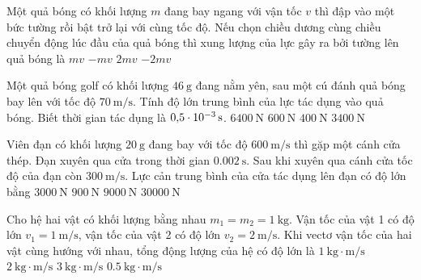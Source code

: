 \begin{ex}
	Một quả bóng có khối lượng $m$ đang bay ngang với vận tốc $v$ thì đập vào một bức tường rồi bật trở lại với cùng tốc độ. Nếu chọn chiều dương cùng chiều chuyển động lúc đầu của quả bóng thì xung lượng của lực gây ra bởi tường lên quả bóng là
	\choice
	{$mv$}
	{$-mv$}
	{$2mv$}
	{\True $-2mv$}
\end{ex}
\begin{ex}
Một quả bóng golf có khối lượng $\SI{46}{\gram}$ đang nằm yên, sau một cú đánh quả bóng bay lên với tốc độ $\SI{70}{\meter/\second}$. Tính độ lớn trung bình của lực tác dụng vào quả bóng. Biết thời gian tác dụng là $\SI{0.5E-3}{\second}$.	
	\choice
	{\True $\SI{6400}{\newton}$}
	{$\SI{600}{\newton}$}
	{$\SI{400}{\newton}$}
	{$\SI{3400}{\newton}$}
\end{ex}
\begin{ex}
	Viên đạn có khối lượng $\SI{20}{\gram}$ đang bay với tốc độ $\SI{600}{\meter/\second}$ thì gặp một cánh cửa thép. Đạn xuyên qua cửa trong thời gian $\SI{0.002}{\second}$. Sau khi xuyên qua cánh cửa tốc độ của đạn còn $\SI{300}{\meter/\second}$. Lực cản trung bình của cửa tác dụng lên đạn có độ lớn bằng
	\choice
	{\True $\SI{3000}{\newton}$}
	{$\SI{900}{\newton}$}
	{$\SI{9000}{\newton}$}
	{$\SI{30000}{\newton}$}
\end{ex}
\begin{ex}
	Cho hệ hai vật có khối lượng bằng nhau $m_1 = m_2 = \SI{1}{\kilogram}$. Vận tốc của vật 1 có độ lớn $v_1 =\SI{1}{\meter/\second}$, vận tốc của vật 2 có độ lớn $v_2 =\SI{2}{\meter/\second}$. Khi vectơ vận tốc của hai vật cùng hướng với nhau, tổng động lượng của hệ có độ lớn là
	\choice
	{$\SI{1}{\kilogram\cdot\meter/\second}$}
	{$\SI{2}{\kilogram\cdot\meter/\second}$}
	{\True $\SI{3}{\kilogram\cdot\meter/\second}$}
	{$\SI{0.5}{\kilogram\cdot\meter/\second}$}
\end{ex}
